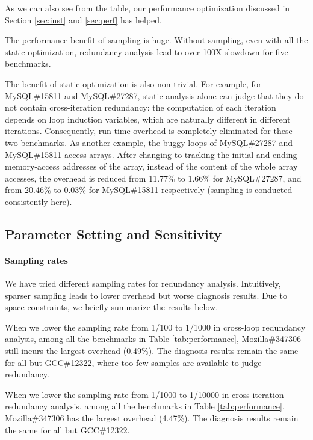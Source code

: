As we can also see from the table, our performance optimization discussed in 
Section \ref{sec:inst} and \ref{sec:perf} has helped.

The performance benefit of sampling is huge.
Without sampling, even with all the static optimization, redundancy
analysis lead to over 100X slowdown for five benchmarks.

The benefit of static optimization is also non-trivial. 
For example, for MySQL\#15811 and MySQL\#27287, static analysis alone can
judge that they do not contain cross-iteration redundancy: the computation of 
each iteration depends on loop induction variables, which are naturally different
in different iterations. Consequently, run-time overhead is completely
eliminated for these two benchmarks.
As another example, the buggy loops of MySQL\#27287 and MySQL\#15811 access 
arrays. 
After changing to tracking the initial and ending memory-access addresses
of the array, instead of the content of the whole array accesses,
the overhead is reduced from 11.77\% to 1.66\% for MySQL\#27287, 
and from 20.46\% to 0.03\% for MySQL\#15811 respectively 
(sampling is conducted consistently here). 

\subsection{Parameter Setting and Sensitivity}
\label{sec:sensi}
\paragraph{Sampling rates}
We have tried different sampling rates for redundancy analysis.
Intuitively, sparser sampling leads to lower overhead but worse diagnosis
results. Due to space constraints, we briefly summarize the results below.

When we lower the sampling rate from 1/100 to 1/1000 
in cross-loop redundancy analysis,
among all the benchmarks in Table \ref{tab:performance},
Mozilla\#347306 still incurs the largest overhead (0.49\%). 
The diagnosis results remain the same for all but
GCC\#12322, where too few samples are available
to judge redundancy.

When we lower the sampling rate from 1/1000 to 1/10000
in cross-iteration redundancy analysis,
among all the benchmarks in Table \ref{tab:performance},
Mozilla\#347306 has the largest overhead (4.47\%). 
The diagnosis results remain 
the same for all but GCC\#12322.

